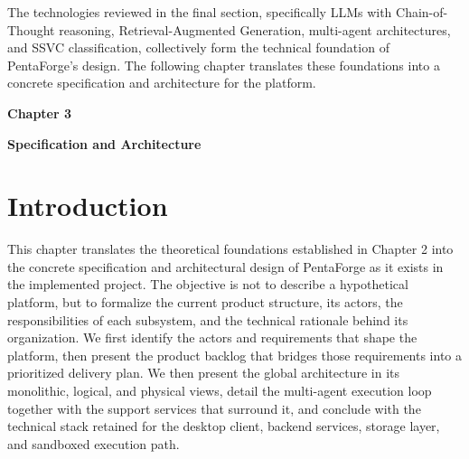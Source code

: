 \documentclass[12pt,a4paper]{report}
\begin{document}
The technologies reviewed in the final section, specifically LLMs with Chain-of-Thought
reasoning, Retrieval-Augmented Generation, multi-agent architectures, and SSVC
classification, collectively form the technical foundation of PentaForge's design.
The following chapter translates these foundations into a concrete specification and
architecture for the platform.

\pagestyle{fancy}
\newpage
\pagestyle{chapterthree}

\vspace*{4cm}

{\fontsize{26}{30}\selectfont \textbf{Chapter 3}}\par

\vspace{1cm}

{\LARGE\bfseries Specification and Architecture}

\vspace{0.8cm}
\setcounter{chapter}{3}
\setcounter{section}{0}
\setcounter{table}{0}
\setcounter{figure}{0}


\section{Introduction}

This chapter translates the theoretical foundations established in Chapter 2 into
the concrete specification and architectural design of PentaForge as it exists in
the implemented project. The objective is not to describe a hypothetical platform,
but to formalize the current product structure, its actors, the responsibilities of
each subsystem, and the technical rationale behind its organization. We first
identify the actors and requirements that shape the platform, then present the
product backlog that bridges those requirements into a prioritized delivery plan.
We then present the global architecture in its monolithic, logical, and physical
views, detail the multi-agent execution loop together with the support services
that surround it, and conclude with the technical stack retained for the desktop
client, backend services, storage layer, and sandboxed execution path.
\end{document}
